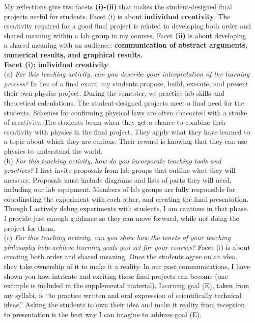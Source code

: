 \documentclass[../../../main.tex]{subfiles}
\begin{document}
My reflections give two facets \textbf{(i)-(ii)} that makes the student-designed final projects useful for students.  Facet (i) is about \textbf{individual creativity}.  The creativity required for a good final project is related to developing both order and shared meaning within a lab group in my courses.  Facet \textbf{(ii)} is about developing a shared meaning with an audience: \textbf{communication of abstract arguments, numerical results, and graphical results.}
\\
\vspace{0.15cm}
\textbf{Facet (i): individual creativity}
\\
\vspace{0.15cm}
(a) \textit{For this teaching activity, can you describe your interpretation of the learning process?} In lieu of a final exam, my students propose, build, execute, and present their own physics project.  During the semester, we practice lab skills and theoretical calculations.  The student-designed projects meet a final need for the students.  Schemes for confirming physical laws are often concocted with a stroke of creativity.  The students beam when they get a chance to combine their creativity with physics in the final project.  They apply what they have learned to a topic about which they are curious.  Their reward is knowing that they can use physics to understand the world. 
\\
\vspace{0.15cm}
(b) \textit{For this teaching activity, how do you incorporate teaching tools and practices?}  I first invite proposals from lab groups that outline what they will measure.  Proposals must include diagrams and lists of parts they will need, including our lab equipment.  Members of lab groups are fully responsible for coordinating the experiment with each other, and creating the final presentation.  Though I actively debug experiments with students, I am cautious in that phase. I provide just enough guidance so they can move forward, while not doing the project for them.
\\
\vspace{0.15cm}
(c) \textit{For this teaching activity, can you show how the tenets of your teaching philosophy help achieve learning goals you set for your courses?} Facet (i) is about creating both order and shared meaning.  Once the students agree on an idea, they take ownership of it to make it a reality.  In our past communications, I have shown you how intricate and exciting these final projects can become (one example is included in the supplemental material).  Learning goal (E), taken from my syllabi, is ``to practice written and oral expression of scientifically technical ideas.''  Asking the students to own their idea and make it reality from inception to presentation is the best way I can imagine to address goal (E).
\end{document}
